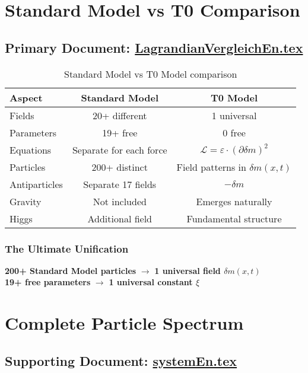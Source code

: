 \documentclass[12pt,a4paper]{report}
\begin{document}
	\section{Standard Model vs T0 Comparison}
	\subsection{Primary Document: \href{https://github.com/jpascher/T0-Time-Mass-Duality/tree/main/2/pdf/LagrandianVergleichEn.pdf}{LagrandianVergleichEn.tex}}
	
	\begin{table}[H]
		\centering
		\begin{tabular}{lcc}
			\toprule
			\textbf{Aspect} & \textbf{Standard Model} & \textbf{T0 Model} \\
			\midrule
			Fields & 20+ different & 1 universal \\
			Parameters & 19+ free & 0 free \\
			Equations & Separate for each force & $\mathcal{L} = \varepsilon \cdot (\partial \delta m)^2$ \\
			Particles & 200+ distinct & Field patterns in $\delta m(x,t)$ \\
			Antiparticles & Separate 17 fields & $-\delta m$ \\
			Gravity & Not included & Emerges naturally \\
			Higgs & Additional field & Fundamental structure \\
			\bottomrule
		\end{tabular}
		\caption{Standard Model vs T0 Model comparison}
		\label{tab:sm-vs-t0}
	\end{table}
	
	\subsubsection{The Ultimate Unification}
	\textbf{200+ Standard Model particles} $\rightarrow$ \textbf{1 universal field $\delta m(x,t)$}\\
	\textbf{19+ free parameters} $\rightarrow$ \textbf{1 universal constant $\xi$}
	
	\section{Complete Particle Spectrum}
	\subsection{Supporting Document: \href{https://github.com/jpascher/T0-Time-Mass-Duality/tree/main/2/pdf/systemEn.pdf}{systemEn.tex}}
	
\end{document}
